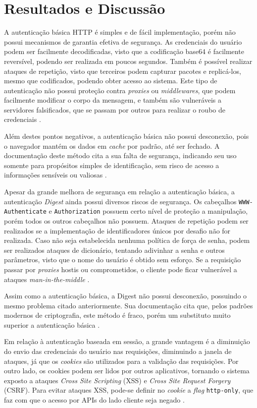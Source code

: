 \section{Resultados e Discussão}

A autenticação básica HTTP é simples e de fácil implementação, porém não possui mecanismos de 
garantia efetiva de segurança. As credenciais do usuário podem ser facilmente decodificadas, visto 
que a codificação base64 é facilmente reversível, podendo ser realizada em poucos segundos. Também 
é possível realizar ataques de repetição, visto que terceiros podem capturar pacotes e replicá-los, 
mesmo que codificados, podendo obter acesso ao sistema. Este tipo de autenticação não possui proteção 
contra \emph{proxies} ou \emph{middlewares}, que podem facilmente modificar o corpo da mensagem, e 
também são vulneráveis a servidores falsificados, que se passam por outros para realizar o roubo de 
credenciais \cite{GOURLEY2002}.

Além destes pontos negativos, a autenticação básica não possui desconexão, pois o navegador mantém 
os dados em \emph{cache} por padrão, até ser fechado. A documentação deste método cita a sua falta 
de segurança, indicando seu uso somente para propósitos simples de identificação, sem risco de 
acesso a informações sensíveis ou valiosas \cite{RFC7617}. 

Apesar da grande melhora de segurança em relação a autenticação básica, a autenticação 
\emph{Digest} ainda possui diversos riscos de segurança. Os cabeçalhos 
\texttt{WWW-Authenticate} e \texttt{Authorization} possuem certo nível de proteção a manipulação, 
porém todos os outros cabeçalhos não possuem. Ataques de repetição podem ser realizados se a 
implementação de identificadores únicos por desafio não for realizada. Caso não seja estabelecida 
nenhuma política de força de senha, podem ser realizados ataques de dicionário, tentando adivinhar 
a senha e outros parâmetros, visto que o nome do usuário é obtido sem esforço. Se a requisição 
passar por \emph{proxies} hostis ou comprometidos, o cliente pode ficar vulnerável a ataques 
\emph{man-in-the-middle} \cite{GOURLEY2002}. 

Assim como a autenticação básica, a Digest não possui desconexão, possuindo o mesmo problema citado
anteriormente. Sua documentação cita que, pelos padrões modernos de criptografia, este método 
é fraco, porém um substituto muito superior a autenticação básica \cite{RFC7616}.

Em relação à autenticação baseada em sessão, a grande vantagem é a diminuição do envio das 
credenciais do usuário nas requisições, diminuindo a janela de ataques, já que os \emph{cookies} 
são utilizados para a validação das requisições. Por outro lado, os cookies podem ser lidos por 
outros aplicativos, tornando o sistema exposto a ataques \emph{Cross Site Scripting} (XSS) e 
\emph{Cross Site Request Forgery} (CSRF). Para evitar ataques XSS, pode-se definir no \emph{cookie} 
a \emph{flag} \texttt{http-only}, que faz com que o acesso por APIs do lado cliente seja negado 
\cite{PAPATHANASAKI2022}. 

